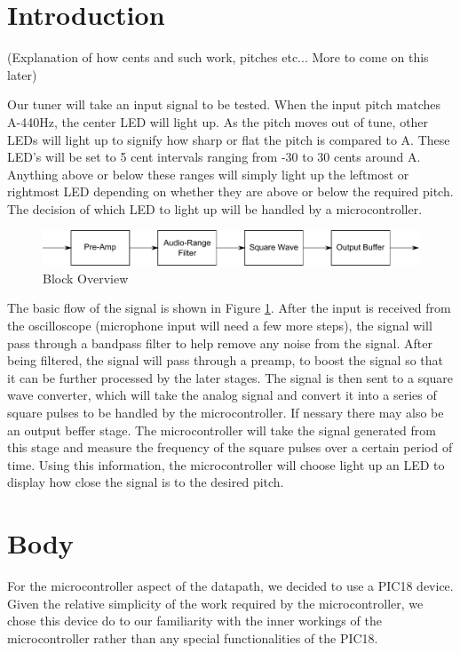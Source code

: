 \documentclass[12pt]{article}
\begin{document}
\section{Introduction}

(Explanation of how cents and such work, pitches etc... More to come on this later)

Our tuner will take an input signal to be tested. When the input pitch matches A-440Hz, the
center LED will light up. As the pitch moves out of tune, other LEDs will light up to signify how sharp or
flat the pitch is compared to A. These LED's will be set to 5 cent intervals ranging from -30 to 30 cents
around A. Anything above or below these ranges will simply light up the leftmost or rightmost LED
depending on whether they are above or below the required pitch. The decision of which LED to light up
will be handled by a microcontroller.

\begin{figure}[H]
\centering
	\includegraphics[width=6in]{"Block Overview"}
	\caption{Block Overview}
	\label{block} 
\end{figure}

The basic flow of the signal is shown in Figure \ref{block}. After the input is received from the oscilloscope
(microphone input will need a few more steps), the signal will pass through a bandpass filter to help
remove any noise from the signal. After being filtered, the signal will pass through a preamp, to boost
the signal so that it can be further processed by the later stages. The signal is then sent to a square
wave converter, which will take the analog signal and convert it into a series of square pulses to be
handled by the microcontroller. If nessary there may also be an output beffer stage. The microcontroller
will take the signal generated from this stage and
measure the frequency of the square pulses over a certain period of time. Using this information, the
microcontroller will choose light up an LED to display how close the signal is to the desired pitch.

\section{Body}

For the microcontroller aspect of the datapath, we decided to use a PIC18 device. Given the relative
simplicity of the work required by the microcontroller, we chose this device do to our familiarity with
the inner workings of the microcontroller rather than any special functionalities of the PIC18.
\end{document}
